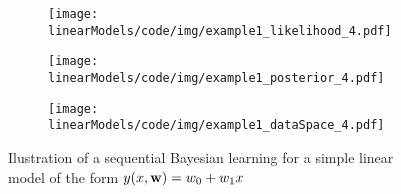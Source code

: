 \begin{figure}[H]
\begin{subfigure}[c]{0.32\textwidth}
\texttt{[image: linearModels/code/img/example1\_likelihood\_4.pdf]} 
\end{subfigure}
\begin{subfigure}[c]{0.32\textwidth}
\texttt{[image: linearModels/code/img/example1\_posterior\_4.pdf]} 
\end{subfigure}
\begin{subfigure}[c]{0.32\textwidth}
\texttt{[image: linearModels/code/img/example1\_dataSpace\_4.pdf]} 
\end{subfigure}
\caption{Ilustration of a sequential Bayesian learning for a simple linear model of the form $y(x,\mathbf{w})= w_0 + w_1 x$}
\end{figure}










